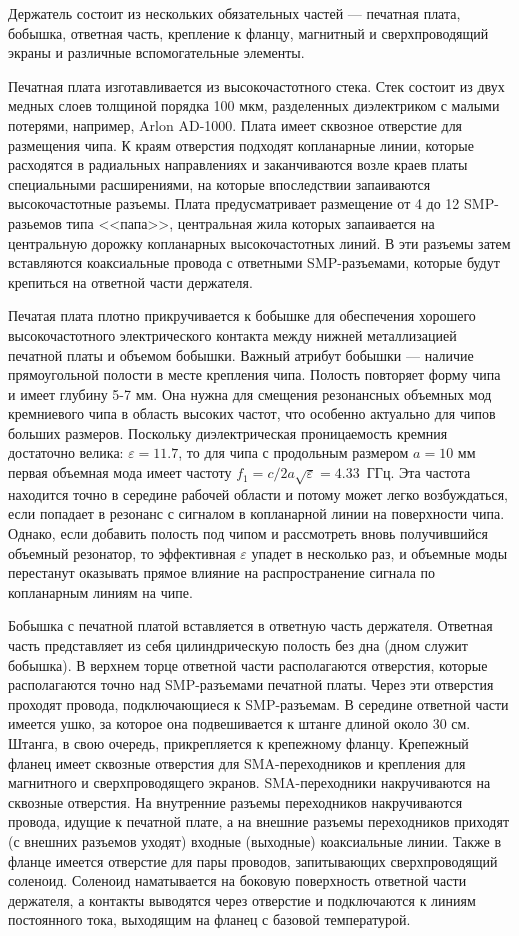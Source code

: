 Держатель состоит из нескольких обязательных частей --- печатная плата, бобышка, ответная часть, крепление к фланцу, магнитный и сверхпроводящий экраны и различные вспомогательные элементы. 

Печатная плата изготавливается из высокочастотного стека. Стек состоит из двух медных слоев толщиной порядка 100 мкм, разделенных диэлектриком с малыми потерями, например, Arlon AD-1000. Плата имеет сквозное отверстие для размещения чипа. К краям отверстия подходят копланарные линии, которые расходятся в радиальных направлениях и заканчиваются возле краев платы специальными расширениями, на которые впоследствии запаиваются высокочастотные разъемы. Плата предусматривает размещение от 4 до 12 SMP-разьемов типа <<папа>>, центральная жила которых запаивается на центральную дорожку копланарных высокочастотных линий. В эти разъемы затем вставляются коаксиальные провода с ответными SMP-разъемами, которые будут крепиться на ответной части держателя. 

Печатая плата плотно прикручивается к бобышке для обеспечения хорошего высокочастотного электрического контакта между нижней металлизацией печатной платы и объемом бобышки. Важный атрибут бобышки --- наличие прямоугольной полости в месте крепления чипа. Полость повторяет форму чипа и имеет глубину 5-7 мм. Она нужна для смещения резонансных объемных мод кремниевого чипа в область высоких частот, что особенно актуально для чипов больших размеров. Поскольку диэлектрическая проницаемость кремния достаточно велика: $\varepsilon=11.7$, то для чипа с продольным размером $a=10$ мм первая объемная мода имеет частоту $f_1 = c/2a\sqrt{\varepsilon}=4.33$~ГГц. Эта частота находится точно в середине рабочей области и потому может легко возбуждаться, если попадает в резонанс с сигналом в копланарной линии на поверхности чипа. Однако, если добавить полость под чипом и рассмотреть вновь получившийся объемный резонатор, то эффективная $\varepsilon$ упадет в несколько раз, и объемные моды перестанут оказывать прямое влияние на распространение сигнала по копланарным линиям на чипе. 

Бобышка с печатной платой вставляется в ответную часть держателя. Ответная часть представляет из себя цилиндрическую полость без дна (дном служит бобышка). В верхнем торце ответной части располагаются отверстия, которые располагаются точно над SMP-разъемами печатной платы. Через эти отверстия проходят провода, подключающиеся к SMP-разъемам. В середине ответной части имеется ушко, за которое она подвешивается к штанге длиной около 30 см. Штанга, в свою очередь, прикрепляется к крепежному фланцу. Крепежный фланец имеет сквозные отверстия для SMA-переходников и крепления для магнитного и сверхпроводящего экранов. SMA-переходники накручиваются на сквозные отверстия. На внутренние разъемы переходников накручиваются провода, идущие к печатной плате, а на внешние разъемы переходников приходят (с внешних разъемов уходят) входные (выходные) коаксиальные линии. Также в фланце имеется отверстие для пары проводов, запитывающих сверхпроводящий соленоид. Соленоид наматывается на боковую поверхность ответной части держателя, а контакты выводятся через отверстие и подключаются к линиям постоянного тока, выходящим на фланец с базовой температурой.

